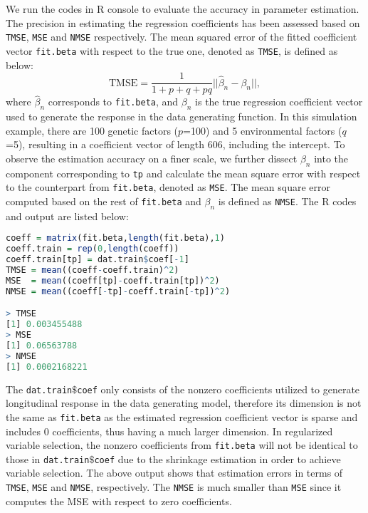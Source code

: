 \documentclass[12pt]{article}
\begin{document}
{\color{blue} We run the codes in R console to evaluate the accuracy in parameter estimation. The precision in estimating the regression coefficients has been assessed based on \texttt{TMSE}, \texttt{MSE} and \texttt{NMSE} respectively. The mean squared error of the fitted coefficient vector \texttt{fit.beta} with respect to the true one, denoted as \texttt{TMSE}, is defined as below:
\begin{equation*}
\text{TMSE}=\frac{1}{1+p+q+pq}||\hat{\beta}_n-\beta_n||,
\end{equation*}
where $\hat{\beta}_n$ corresponds to \texttt{fit.beta}, and $\beta_n$ is the true regression coefficient vector used to generate the response in the data generating function. In this simulation example, there are 100 genetic factors ($p$=100) and 5 environmental factors ($q$=5), resulting in a coefficient vector of length 606, including the intercept. To observe the estimation accuracy on a finer scale, we further dissect $\beta_n$ into the component corresponding to \texttt{tp} and calculate the mean square error with respect to the counterpart from \texttt{fit.beta}, denoted as \texttt{MSE}. The mean square error computed based on the rest of \texttt{fit.beta} and $\beta_n$ is defined as \texttt{NMSE}. The R codes and output are listed below:
} 

   

\begin{lstlisting}[language=R]
coeff = matrix(fit.beta,length(fit.beta),1)
coeff.train = rep(0,length(coeff))
coeff.train[tp] = dat.train$coef[-1]
TMSE = mean((coeff-coeff.train)^2)
MSE  = mean((coeff[tp]-coeff.train[tp])^2)
NMSE = mean((coeff[-tp]-coeff.train[-tp])^2)

> TMSE
[1] 0.003455488
> MSE
[1] 0.06563788
> NMSE
[1] 0.0002168221
\end{lstlisting}

{\color{blue} The \texttt{dat.train$\$$coef} only consists of the nonzero coefficients utilized to generate longitudinal response in the data generating model, therefore its dimension is not the same as \texttt{fit.beta} as the estimated regression coefficient vector is sparse and includes 0 coefficients, thus having a much larger dimension. In regularized variable selection, the nonzero coefficients from \texttt{fit.beta} will not be identical to those in \texttt{dat.train$\$$coef} due to the shrinkage estimation in order to achieve variable selection.} The above output shows that estimation errors in terms of \texttt{TMSE}, \texttt{MSE} and \texttt{NMSE}, respectively. The \texttt{NMSE} is much smaller than \texttt{MSE} since it computes the MSE with respect to zero coefficients. 
\end{document}
